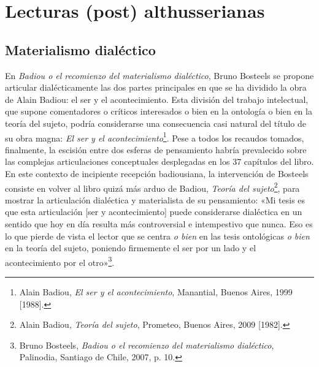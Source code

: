 \section{Lecturas (post) althusserianas}

\subsection{Materialismo dialéctico}

En \emph{Badiou o el recomienzo del materialismo dialéctico}, Bruno Bosteels se propone articular dialécticamente las dos partes principales en que se ha dividido la obra de Alain Badiou: el ser y el acontecimiento. Esta división del trabajo intelectual, que supone comentadores o críticos interesados o bien en la ontología o bien en la teoría del sujeto, podría considerarse una consecuencia casi natural del título de su obra magna: \emph{El ser y el acontecimiento}\footnote{Alain Badiou, \emph{El ser y el acontecimiento}, Manantial, Buenos Aires, 1999 {[}1988{]}.}. Pese a todos los recaudos tomados, finalmente, la escisión entre dos esferas de pensamiento habría prevalecido sobre las complejas articulaciones conceptuales desplegadas en los 37 capítulos del libro. En este contexto de incipiente recepción badiousiana, la intervención de Bosteels consiste en volver al libro quizá más arduo de Badiou, \emph{Teoría del sujeto}\footnote{Alain Badiou, \emph{Teoría del sujeto}, Prometeo, Buenos Aires, 2009 {[}1982{]}.}, para mostrar la articulación dialéctica y materialista de su pensamiento: «Mi tesis es que esta articulación {[}ser y acontecimiento{]} puede considerarse dialéctica en un sentido que hoy en día resulta más controversial e intempestivo que nunca. Eso es lo que pierde de vista el lector que se centra \emph{o bien} en las tesis ontológicas \emph{o bien} en la teoría del sujeto, poniendo firmemente el ser por un lado y el acontecimiento por el otro»\footnote{Bruno Bosteels, \emph{Badiou o el recomienzo del materialismo dialéctico}, Palinodia, Santiago de Chile, 2007, p. 10.}.

